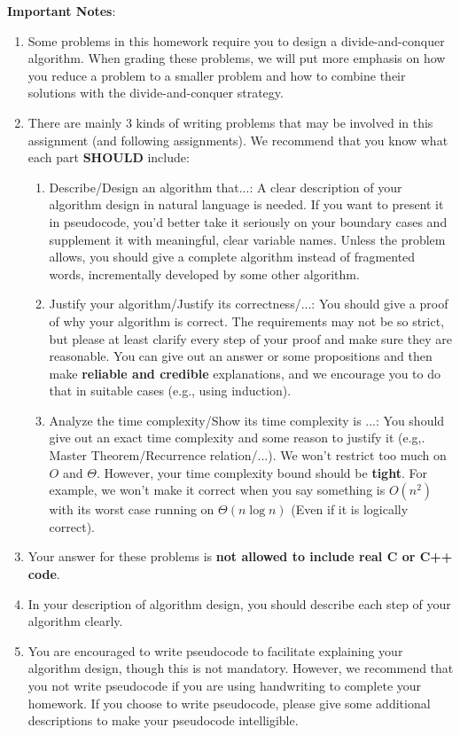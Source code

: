 {\large\textbf{Important Notes}:}

\begin{enumerate}
    \item Some problems in this homework require you to design a divide-and-conquer algorithm. When grading these problems, we will put more emphasis on how you reduce a problem to a smaller problem and how to combine their solutions with the divide-and-conquer strategy.
    \item There are mainly $3$ kinds of writing problems that may be involved in this assignment (and following assignments).
    We recommend that you know what each part \textbf{SHOULD} include:
    \begin{enumerate}
        \item [1.] Describe/Design an algorithm that...: A clear description of your algorithm design in natural language is needed. If you want to present it in pseudocode, you'd better take it seriously on your boundary cases and supplement it with meaningful, clear variable names. Unless the problem allows, you should give a complete algorithm instead of fragmented words, incrementally developed by some other algorithm.
        \item [2.] Justify your algorithm/Justify its correctness/...: You should give a proof of why your algorithm is correct. The requirements may not be so strict, but please at least clarify every step of your proof and make sure they are reasonable. You can give out an answer or some propositions and then make \textbf{reliable and credible} explanations, and we encourage you to do that in suitable cases (e.g., using induction).
        \item [3.] Analyze the time complexity/Show its time complexity is ...: You should give out an exact time complexity and some reason to justify it (e.g,. Master Theorem/Recurrence relation/...). We won't restrict too much on $O$ and $\Theta$. However, your time complexity bound should be \textbf{tight}. For example, we won't make it correct when you say something is $O(n^2)$ with its worst case running on $\Theta(n\log n)$ (Even if it is logically correct).
    \end{enumerate}
    \item Your answer for these problems is \textbf{not allowed to include real C or C++ code}.
    \item In your description of algorithm design, you should describe each step of your algorithm clearly.
    \item You are encouraged to write pseudocode to facilitate explaining your algorithm design, though this is not mandatory. However, we recommend that you not write pseudocode if you are using handwriting to complete your homework. If you choose to write pseudocode, please give some additional descriptions to make your pseudocode intelligible.

\end{enumerate}

